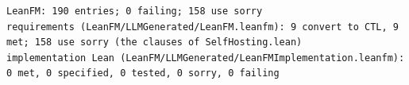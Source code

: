\begin{lstlisting}[language={},basicstyle=\ttfamily\footnotesize,breaklines=true]
LeanFM: 190 entries; 0 failing; 158 use sorry
requirements (LeanFM/LLMGenerated/LeanFM.leanfm): 9 convert to CTL, 9 met; 158 use sorry (the clauses of SelfHosting.lean)
implementation Lean (LeanFM/LLMGenerated/LeanFMImplementation.leanfm): 0 met, 0 specified, 0 tested, 0 sorry, 0 failing
\end{lstlisting}
